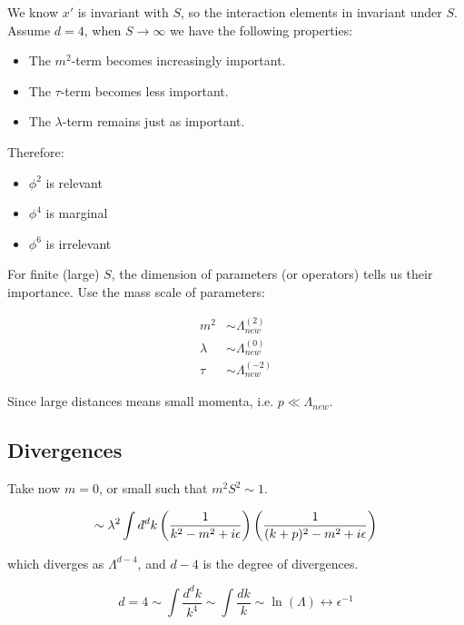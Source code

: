 \documentclass[10pt]{article}
\begin{document}
	We know $x'$ is invariant with $S$, so the interaction elements in invariant under $S$. Assume $d=4$, when $S\rightarrow\infty$ we have the following properties:
	
	\begin{itemize}
		\item The $m^2$-term becomes increasingly important.
		\item The $\tau$-term becomes less important.
		\item The $\lambda$-term remains just as important.
	\end{itemize}
	
	Therefore:
	
	\begin{itemize}
		\item $\phi^2$ is relevant
		\item $\phi^4$ is marginal
		\item $\phi^6$ is irrelevant
	\end{itemize}
	
	For finite (large) $S$, the dimension of parameters (or operators) tells us their importance. Use the mass scale of parameters:
	
	\begin{align}
		m^2 &\sim \Lambda_{new}^{(2)} \\
		\lambda &\sim \Lambda_{new}^{(0)} \\
		\tau &\sim \Lambda_{new}^{(-2)}
	\end{align}
	
	Since large distances means small momenta, i.e. $p \ll \Lambda_{new}$.
	
	\subsection{Divergences}
	Take now $m=0$, or small such that $m^2S^2 \sim 1$.
	
	\begin{equation}
		\sim \lambda^2\int d\hspace*{-0.08em}\bar{}\hspace*{0.1em}^dk\left(\frac{1}{k^2 - m^2 + i\epsilon}\right)\left(\frac{1}{(k+p)^2 - m^2 + i\epsilon}\right)
	\end{equation}
	
	which diverges as $\Lambda^{d-4}$, and $d-4$ is the degree of divergences.
	
	\begin{equation}
		d=4 \sim \int \frac{d^dk}{k^4} \sim \int \frac{dk}{k} \sim \ln(\Lambda) \leftrightarrow \epsilon^{-1}
	\end{equation}
	
\end{document}
